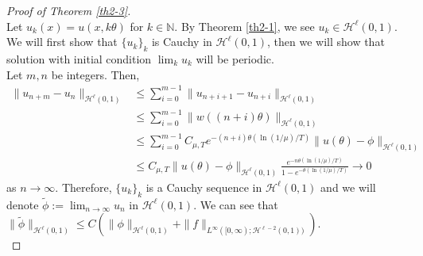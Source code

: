 \documentclass[10pt,a4paper,final]{article}
\numberwithin{equation}{section}
\newcommand{\N}{\mathbb{N}}
\newcommand{\cH}{\mathcal{H}}
\begin{document}
\begin{proof}[Proof of Theorem \ref{th2-3}]\ \\
Let $u_k(x)=u(x,k\theta)$ for $k\in \N$. By Theorem \ref{th2-1}, we see $u_k\in \cH^{\ell}(0,1)$. We will first show that $\{u_k\}_k$ is Cauchy in $\cH^{\ell}(0,1)$, then we will show that solution with initial condition $\lim_k u_k$ will be periodic.\\

    Let $m,n$ be integers. Then,
    \begin{align*}
        \|u_{n+m}-u_n\|_{\cH^{\ell}(0,1)}&\leq \sum_{i=0}^{m-1}\|u_{n+i+1}-u_{n+i}\|_{\cH^{\ell}(0,1)}\\
        &\leq \sum_{i=0}^{m-1}\|w((n+i)\theta)\|_{\cH^{\ell}(0,1)}\\
        &\leq \sum_{i=0}^{m-1}C_{\mu,T}e^{-(n+i)\theta(\ln(1/\mu)/T)}\|u(\theta)-\phi\|_{\cH^{\ell}(0,1)}\\
        &\leq C_{\mu,T}\|u(\theta)-\phi\|_{\cH^{\ell}(0,1)}\frac{e^{-n\theta(\ln(1/\mu)/T)}}{1-e^{-\theta(\ln(1/\mu)/T)}}\to 0
    \end{align*}
    as $n\to\infty$. Therefore, $\{ u_{k}\}_k$ is a Cauchy sequence in $\cH^{\ell}(0,1)$ and we will denote $\widetilde{\phi}:=\lim_{n\to\infty}u_n$ in $\cH^{\ell}(0,1)$. We can see that $\|\widetilde{\phi}\|_{\cH^\ell(0,1)}\leq C(\|\phi\|_{\cH^\ell(0,1)}+\|f\|_{L^\infty([0,\infty);\cH^{\ell-2}(0,1))})$.\\


\end{proof}
\end{document}
